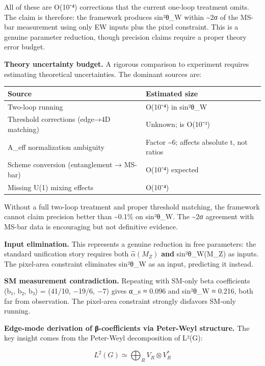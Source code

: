 All of these are O(10⁻⁴) corrections that the current one-loop treatment omits. The claim is therefore: the framework produces sin²θ\_W within \textasciitilde2σ of the MS-bar measurement using only EW inputs plus the pixel constraint. This is a genuine parameter reduction, though precision claims require a proper theory error budget.

\textbf{Theory uncertainty budget.} A rigorous comparison to experiment requires estimating theoretical uncertainties. The dominant sources are:

{\def\LTcaptype{none} %
\begin{longtable}[]{@{}>{\RaggedRight\arraybackslash}p{}>{\RaggedRight\arraybackslash}p{}@{}}
\toprule\noalign{}
Source & Estimated size \\
\midrule\noalign{}
\endhead
\bottomrule\noalign{}
\endlastfoot
Two-loop running & O(10⁻⁴) in sin²θ\_W \\
Threshold corrections (edge→4D matching) & Unknown; is O(10⁻³) \\
A\_eff normalization ambiguity & Factor \textasciitilde6; affects absolute t, not ratios \\
Scheme conversion (entanglement → MS-bar) & O(10⁻⁴) expected \\
Missing U(1) mixing effects & O(10⁻⁴) \\
\end{longtable}
}

Without a full two-loop treatment and proper threshold matching, the framework cannot claim precision better than \textasciitilde0.1\% on sin²θ\_W. The \textasciitilde2σ agreement with MS-bar data is encouraging but not definitive evidence.

\textbf{Input elimination.} This represents a genuine reduction in free parameters: the standard unification story requires both \(\hat{\alpha}(M_Z)\) \textbf{and} sin²θ\_W(M\_Z) as inputs. The pixel-area constraint eliminates sin²θ\_W as an input, predicting it instead.

\textbf{SM measurement contradiction.} Repeating with SM-only beta coefficients (b₁, b₂, b₃) = (41/10, −19/6, −7) gives α\_s ≈ 0.096 and sin²θ\_W ≈ 0.216, both far from observation. The pixel-area constraint strongly disfavors SM-only running.

\textbf{Edge-mode derivation of β-coefficients via Peter-Weyl structure.} The key insight comes from the Peter-Weyl decomposition of L²(G):

\[
L^2(G) \simeq \bigoplus_R V_R \otimes V_R^*
\]

